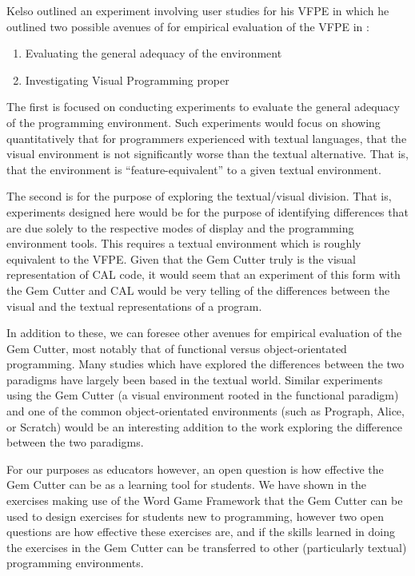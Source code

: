 Kelso outlined an experiment involving user studies for his VFPE in which he outlined two possible avenues of for empirical evaluation of the VFPE in \cite{Kelso02}:

\begin{enumerate}
	\item Evaluating the general adequacy of the environment
	\item Investigating Visual Programming proper
\end{enumerate}

The first is focused on conducting experiments to evaluate the general adequacy of the programming environment.  Such experiments would focus on showing quantitatively that for programmers experienced with textual languages, that the visual environment is not significantly worse than the textual alternative.  That is, that the environment is ``feature-equivalent'' to a given textual environment.

The second is for the purpose of exploring the textual/visual division.  That is, experiments designed here would be for the purpose of identifying differences that are due solely to the respective modes of display and the programming environment tools.  This requires a textual environment which is roughly equivalent to the VFPE.  Given that the Gem Cutter truly is the visual representation of CAL code, it would seem that an experiment of this form with the Gem Cutter and CAL would be very telling of the differences between the visual and the textual representations of a program.

In addition to these, we can foresee other avenues for empirical evaluation of the Gem Cutter, most notably that of functional versus object-orientated programming.  Many studies which have explored the differences between the two paradigms have largely been based in the textual world.  Similar experiments using the Gem Cutter (a visual environment rooted in the functional paradigm) and one of the common object-orientated environments (such as Prograph, Alice, or Scratch) would be an interesting addition to the work exploring the difference between the two paradigms.

For our purposes as educators however, an open question is how effective the Gem Cutter can be as a learning tool for students.  We have shown in the exercises making use of the Word Game Framework that the Gem Cutter can be used to design exercises for students new to programming, however two open questions are how effective these exercises are, and if the skills learned in doing the exercises in the Gem Cutter can be transferred to other (particularly textual) programming environments.

